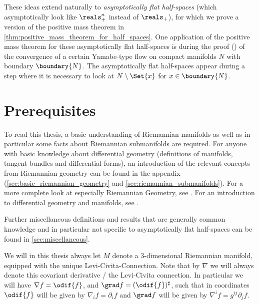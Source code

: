 \documentclass[titlepage,numbers=noenddot,oneside,%
cleardoublepage=empty,paper=a4,fontsize=11pt,%
english,%
]{scrartcl}
\begin{document}
These ideas extend naturally to \emph{asymptotically flat half-spaces} (which asymptotically look like \( \reals^n_+ \) instead of \( \reals_+ \)), for which we prove a version of the positive mass theorem in \cref{thm:positive_mass_theorem_for_half_spaces}. One application of the positive mass theorem for these asymptotically flat half-spaces is during the proof (\cite{almarazConvergenceScalarflatMetrics2015}) of the convergence of a  certain Yamabe-type flow on compact manifolds \( N \) with boundary \( \boundary{N} \). The asymptotically flat half-spaces appear during a step where it is necessary to look at \( N\setminus \Set{x} \) for \( x\in \boundary{N} \). 

\section{Prerequisites}
To read this thesis, a basic understanding of Riemannian manifolds as well as in particular some facts about Riemannian submanifolds are required. For anyone with basic knowledge about differential geometry (definitions of manifolds, tangent bundles and differential forms), an introduction of the relevant concepts from Riemannian geometry can be found in the appendix (\cref{sec:basic_riemannian_geometry} and \cref{sec:riemannian_submanifolds}). For a more complete look at especially Riemannian Geometry, see \cite[Chapters 1 and 2]{petersenRiemannianGeometry2006}. For an introduction to differential geometry and manifolds, see \cite{leeIntroductionSmoothManifolds2012}.

Further miscellaneous definitions and results that are generally common knowledge and in particular not specific to asymptotically flat half-spaces can be found in \cref{sec:miscellaneous}.

\begin{notation}
    We will in this thesis always let \( M \) denote a 3-dimensional Riemannian manifold, equipped with the unique Levi-Civita-Connection. Note that by \( \nabla \) we will always denote this covariant derivative / the Levi-Civita connection. In particular we will have \( \nabla f=\odif{f} \), and \( \grad f=(\odif{f})^\sharp \), such that in coordinates \( \odif{f} \) will be given by \( \nabla_i f=\partial_i f \) and \( \grad f \) will be given by \( \nabla^i f=g^{ij}\partial_j f \).
\end{notation}
\end{document}
